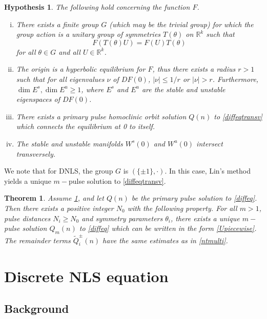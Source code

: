 \documentclass[12pt]{elsarticle}
\def\R{{\mathbb R}}
\newtheorem{theorem}{Theorem}
\newtheorem{hypothesis}{Hypothesis}
\begin{document}
\begin{hypothesis}\label{transversehyp}
The following hold concerning the function $F$.
\begin{enumerate}[(i)]
\item There exists a finite group $G$ (which may be the trivial group) for which the group action is a unitary group of symmetries $T(\theta)$ on $\R^k$ such that 
\begin{equation}\label{symmetrytransverse}
F(T(\theta)U) = F(U)T(\theta)
\end{equation}
for all $\theta \in G$ and all $U \in \R^k$. 
\item The origin is a hyperbolic equilibrium for $F$, thus there exists a radius $r > 1$ such that for all eigenvalues $\nu$ of $DF(0)$, $|\nu| \leq 1/r$ or $|\nu| > r$. Furthermore, $\dim E^s, \dim E^u \geq 1$, where $E^s$ and $E^u$ are the stable and unstable eigenspaces of $DF(0)$.
\item There exists a primary pulse homoclinic orbit solution $Q(n)$ to \cref{diffeqtransv} which connects the equilibrium at 0 to itself.
\item The stable and unstable manifolds $W^s(0)$ and $W^u(0)$ intersect transversely.
\end{enumerate}
\end{hypothesis}
We note that for DNLS, the group $G$ is $( \{\pm 1\}, \cdot)$. In this case, Lin's method yields a unique $m-$pulse solution to \cref{diffeqtransv}.

\begin{theorem}\label{transversemulti}
Assume \cref{transversehyp}, and let $Q(n)$ be the primary pulse solution to \cref{diffeq}. Then there exists a positive integer $N_0$ with the following property. For all $m > 1$, pulse distances $N_i \geq N_0$ and symmetry parameters $\theta_i$, there exists a unique $m-$pulse solution $Q_m(n)$ to \cref{diffeq} which can be written in the form \cref{Upiecewise}. The remainder terms $\tilde{Q}_i^\pm(n)$ have the same estimates as in \cref{ntmulti}.
\end{theorem}

\section{Discrete NLS equation}\label{sec:DNLS}

\subsection{Background}
\end{document}
